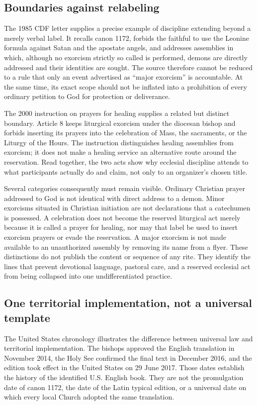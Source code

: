 \subsection{Boundaries against relabeling}

The 1985 CDF letter supplies a precise example of discipline extending beyond
a merely verbal label. It recalls canon 1172, forbids the faithful to use the
Leonine formula against Satan and the apostate angels, and addresses assemblies
in which, although no exorcism strictly so called is performed, demons are
directly addressed and their identities are sought. The source therefore
cannot be reduced to a rule that only an event advertised as ``major
exorcism'' is accountable. At the same time, its exact scope should not be
inflated into a prohibition of every ordinary petition to God for protection
or deliverance.

The 2000 instruction on prayers for healing supplies a related but distinct
boundary. Article 8 keeps liturgical exorcism under the diocesan bishop and
forbids inserting its prayers into the celebration of Mass, the sacraments, or
the Liturgy of the Hours. The instruction distinguishes healing assemblies
from exorcism; it does not make a healing service an alternative route around
the reservation. Read together, the two acts show why ecclesial discipline
attends to what participants actually do and claim, not only to an organizer's
chosen title.

Several categories consequently must remain visible. Ordinary Christian
prayer addressed to God is not identical with direct address to a demon.
Minor exorcisms situated in Christian initiation are not declarations that a
catechumen is possessed. A celebration does not become the reserved
liturgical act merely because it is called a prayer for healing, nor may that
label be used to insert exorcism prayers or evade the reservation. A major
exorcism is not made available to an unauthorized assembly by removing its
name from a flyer. These distinctions do not publish the content
or sequence of any rite. They identify the lines that prevent devotional
language, pastoral care, and a reserved ecclesial act from being collapsed
into one undifferentiated practice.

\subsection{One territorial implementation, not a universal template}

The United States chronology illustrates the difference between universal
law and territorial implementation. The bishops approved the English
translation in November 2014, the Holy See confirmed the final text in
December 2016, and the edition took effect in the United States on 29 June
2017. Those dates establish the history of the identified U.S. English book.
They are not the promulgation date of canon 1172, the date of the Latin typical
edition, or a universal date on which every local Church adopted the same
translation.

